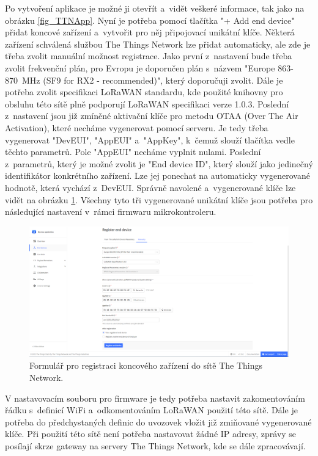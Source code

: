 Po vytvoření aplikace je možné ji otevřít a~vidět veškeré informace, tak jako na obrázku \ref{fig_TTNApp}. Nyní je potřeba pomocí tlačítka "+ Add end device"{} přidat koncové zařízení a~vytvořit pro něj připojovací unikátní klíče. Některá zařízení schválená službou The Things Network lze přidat automaticky, ale zde je třeba zvolit manuální možnost registrace. Jako první z~nastavení bude třeba zvolit frekvenční plán, pro Evropu je doporučen plán s~názvem "Europe 863-870~MHz (SF9 for RX2 - recommended)", který doporučuji zvolit. Dále je potřeba zvolit specifikaci LoRaWAN standardu, kde použité knihovny pro obsluhu této sítě plně podporují LoRaWAN specifikaci verze 1.0.3. Poslední z~nastavení jsou již zmíněné aktivační klíče pro metodu OTAA (Over The Air Activation), které necháme vygenerovat pomocí serveru. Je tedy třeba vygenerovat "DevEUI", "AppEUI"{} a~"AppKey", k~čemuž slouží tlačítka vedle těchto parametrů. Pole "AppEUI"{} necháme vyplnit nulami. Poslední z~parametrů, který je možné zvolit je "End device ID", který slouží jako jedinečný identifikátor konkrétního zařízení. Lze jej ponechat na automaticky vygenerované hodnotě, která vychází z~DevEUI. Správně navolené a~vygenerované klíče lze vidět na obrázku \ref{fig_TTNDeviceGeneration}. Všechny tyto tři vygenerované unikátní klíče jsou potřeba pro následující nastavení v~rámci firmwaru mikrokontroleru.

\begin{figure}[h]
    \centering
    \includegraphics[width=\textwidth]{obrazky/ttnDeviceRegister.png}
    \caption{Formulář pro registraci koncového zařízení do sítě The Things Network.}
    \label{fig_TTNDeviceGeneration}
\end{figure}

V nastavovacím souboru pro firmware je tedy potřeba nastavit zakomentováním řádku s~definicí WiFi a~odkomentováním LoRaWAN použití této sítě. Dále je potřeba do předchystaných definic do uvozovek vložit již zmiňované vygenerované klíče. Při použití této sítě není potřeba nastavovat žádné IP adresy, zprávy se posílají skrze gateway na servery The Things Network, kde se dále zpracovávají.

